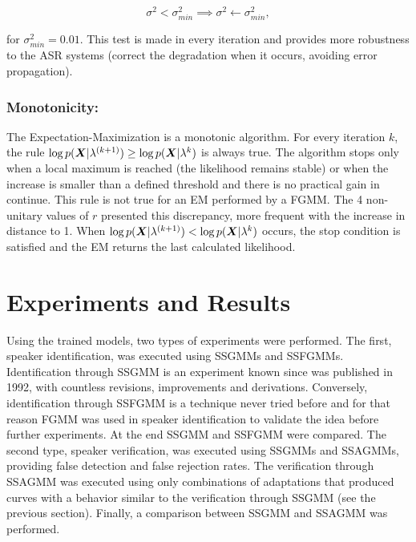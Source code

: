 \begin{equation}
    \sigma^2 < \sigma_{min}^2 \implies \sigma^2 \gets \sigma_{min}^2,
    \label{eq:variance-prune}
\end{equation}

\noindent for $\sigma_{min}^2 = 0.01$. This test is made in every iteration and provides more robustness to the ASR systems (correct the degradation when it occurs, avoiding error propagation).

\subsubsection{Monotonicity:}

The Expectation-Maximization is a monotonic algorithm. For every iteration $k$, the rule $\log p(\boldsymbol{X}|\lambda^{(k+1)}) \geq \log p(\boldsymbol{X}|\lambda^{k})$ is always true. The algorithm stops only when a local maximum is reached (the likelihood remains stable) or when the increase is smaller than a defined threshold and there is no practical gain in continue. This rule is not true for an EM performed by a FGMM. The 4 non-unitary values of $r$ presented this discrepancy, more frequent with the increase in distance to 1. When $\log p(\boldsymbol{X}|\lambda^{(k+1)}) < \log p(\boldsymbol{X}|\lambda^{k})$ occurs, the stop condition is satisfied and the EM returns the last calculated likelihood.

\section{Experiments and Results}
\label{sec:experiments-and-results}

Using the trained models, two types of experiments were performed. The first, speaker identification, was executed using SSGMMs and SSFGMMs. Identification through SSGMM is an experiment known since  was published in 1992, with countless revisions, improvements and derivations. Conversely, identification through SSFGMM is a technique never tried before and for that reason FGMM was used in speaker identification to validate the idea before further experiments. At the end SSGMM and SSFGMM were compared. The second type, speaker verification, was executed using SSGMMs and SSAGMMs, providing false detection and false rejection rates. The verification through SSAGMM was executed using only combinations of adaptations that produced curves with a behavior similar to the verification through SSGMM (see the previous section). Finally, a comparison between SSGMM and SSAGMM was performed.

